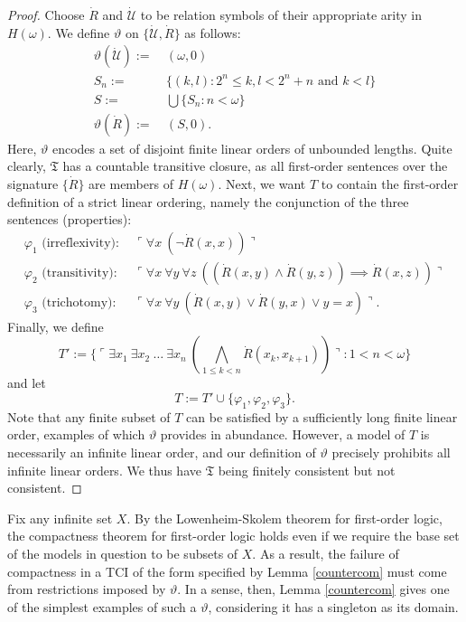 \documentclass[12pt]{article}
\numberwithin{equation}{section}
\begin{document}
\begin{proof}
Choose $\dot{R}$ and $\dot{\mathcal{U}}$ to be relation symbols of their appropriate arity in $H(\omega)$. We define $\vartheta$ on $\{\dot{\mathcal{U}}, \dot{R}\}$ as follows:
\begin{align*}
    \vartheta(\dot{\mathcal{U}}) := \ & (\omega, 0) \\
    S_n :=  \ & \{(k,l) : 2^n \leq k, l < 2^n + n \text{ and } k < l\} \\
    S := \ & \bigcup \{S_n : n < \omega\} \\
    \vartheta(\dot{R}) := \ & (S, 0).
\end{align*}
Here, $\vartheta$ encodes a set of disjoint finite linear orders of unbounded lengths. Quite clearly, $\mathfrak{T}$ has a countable transitive closure, as all first-order sentences over the signature $\{\dot{R}\}$ are members of $H(\omega)$. Next, we want $T$ to contain the first-order definition of a strict linear ordering, namely the conjunction of the three sentences (properties):
\begin{align*}
    \varphi_1 \text{ (irreflexivity)} : \ & \ulcorner \forall x \ (\neg \dot{R}(x, x)) \urcorner \\
    \varphi_2 \text{ (transitivity)} : \ & \ulcorner \forall x \ \forall y \ \forall z \ ((\dot{R}(x, y) \wedge \dot{R}(y, z)) \implies \dot{R}(x, z)) \urcorner \\
    \varphi_3 \text{ (trichotomy)} : \ & \ulcorner \forall x \ \forall y \ (\dot{R}(x, y) \vee \dot{R}(y, x) \vee y = x) \urcorner.
\end{align*}
Finally, we define $$T' := \{\ulcorner \exists x_1 \ \exists x_2 \ \dots \ \exists x_n \ (\bigwedge_{1 \leq k < n} \dot{R}(x_{k}, x_{k + 1})) \urcorner : 1 < n < \omega\}$$ and let $$T := T' \cup \{\varphi_1, \varphi_2, \varphi_3\}.$$ Note that any finite subset of $T$ can be satisfied by a sufficiently long finite linear order, examples of which $\vartheta$ provides in abundance. However, a model of $T$ is necessarily an infinite linear order, and our definition of $\vartheta$ precisely prohibits all infinite linear orders. We thus have $\mathfrak{T}$ being finitely consistent but not consistent.
\end{proof}

Fix any infinite set $X$. By the Lowenheim-Skolem theorem for first-order logic, the compactness theorem for first-order logic holds even if we require the base set of the models in question to be subsets of $X$. As a result, the failure of compactness in a TCI of the form specified by Lemma \ref{countercom} must come from restrictions imposed by $\vartheta$. In a sense, then, Lemma \ref{countercom} gives one of the simplest examples of such a $\vartheta$, considering it has a singleton as its domain.
\end{document}
